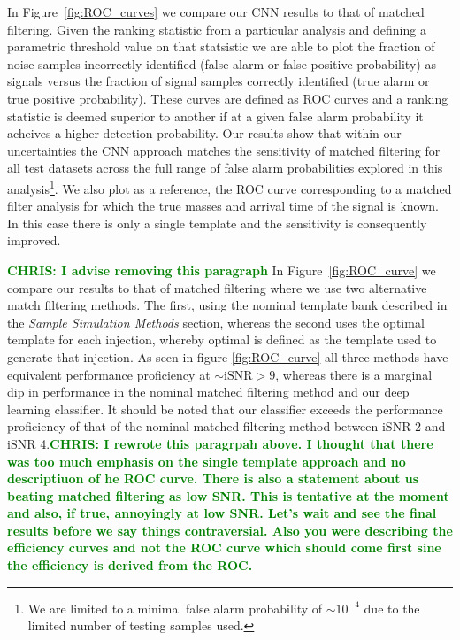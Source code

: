 \documentclass[%
 amsmath,amssymb,
 aps,
 twocolumn,
 prl,
 reprint,
floatfix,
]{revtex4-1}
\newcommand{\chris}[1]{\textbf{\textcolor{green}{CHRIS: #1}}}
\begin{document}
%
%
In Figure~\ref{fig:ROC_curves} we compare our \ac{CNN} results to that of
matched filtering. Given the ranking statistic from a particular analysis and
defining a parametric threshold value on that statsistic we are able to plot
the fraction of noise samples incorrectly identified (false alarm or false
positive probability) as signals versus the fraction of signal samples
correctly identified (true alarm or true positive probability). These curves
are defined as \ac{ROC} curves and a ranking statistic is deemed superior to
another if at a given false alarm probability it acheives a higher detection
probability. Our results show that within our uncertainties the \ac{CNN}
approach matches the sensitivity of matched filtering for all test datasets
across the full range of false alarm probabilities explored in this
analysis\footnote{We are limited to a minimal false alarm probability of $\sim
10^{-4}$ due to the limited number of testing samples used.}. We also plot as a
reference, the \ac{ROC} curve corresponding to a matched filter analysis for
which the true masses and arrival time of the signal is known. In this case
there is only a single template and the sensitivity is consequently improved.  

%
%
\chris{I advise removing this paragraph} In Figure~\ref{fig:ROC_curve} we
compare our results to that of matched filtering where we use two alternative
match filtering methods.  The first, using the nominal template bank described
in the \textit{Sample Simulation Methods} section, whereas the second uses the
optimal template for each injection, whereby optimal is defined as the template
used to generate that injection. As seen in figure \ref{fig:ROC_curve} all
three methods have equivalent performance proficiency at $\sim \mathrm{iSNR} >
9$, whereas there is a marginal dip in performance in the nominal matched
filtering method and our deep learning classifier. It should be noted that our
classifier exceeds the performance proficiency of that of the nominal matched
filtering method between iSNR 2 and iSNR 4.\chris{I rewrote this paragrpah
above. I thought that there was too much emphasis on the single template
approach and no descriptiuon of he ROC curve. There is also a statement about
us beating matched filtering as low SNR. This is tentative at the moment and
also, if true, annoyingly at low SNR.  Let's wait and see the final results
before we say things contraversial. Also you were describing the efficiency
curves and not the ROC curve which should come first sine the efficiency is
derived from the ROC.} 
\end{document}
